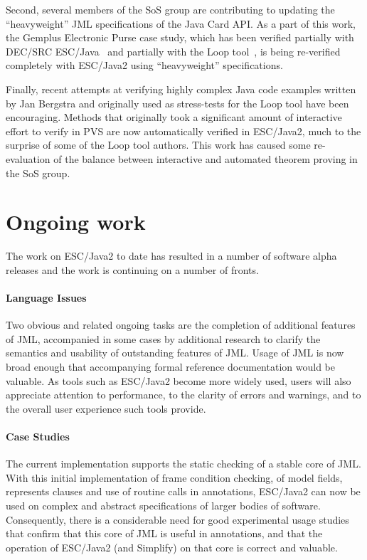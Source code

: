 \documentclass{sig-alternate}
\begin{document}
Second, several members of the SoS group are contributing to updating
the ``heavyweight'' JML specifications of the Java Card API.  As a
part of this work, the Gemplus Electronic Purse case study, which has
been verified partially with DEC/SRC ESC/Java~\cite{CatanoHuisman02}
and partially with the Loop tool~\cite{BreunesseJacobsBerg02}, is being
re-verified completely with ESC/Java2 using ``heavyweight''
specifications.

Finally, recent attempts at verifying highly complex Java code
examples written by Jan Bergstra and originally used as stress-tests
for the Loop tool have been encouraging.  Methods that originally took
a significant amount of interactive effort to verify in PVS are now
automatically verified in ESC/Java2, much to the surprise of some of
the Loop tool authors.  This work has caused some re-evaluation of the
balance between interactive and automated theorem proving in the SoS
group.



\section{Ongoing work}
The work on ESC/Java2 to date has resulted in a number of software
alpha releases and the work is continuing on a number of fronts.

\paragraph*{Language Issues} Two obvious and related ongoing tasks are
the completion of additional features of JML, accompanied in some
cases by additional research to clarify the semantics and usability of
outstanding features of JML.  Usage of JML is now broad enough that
accompanying formal reference documentation would be valuable.  As
tools such as ESC/Java2 become more widely used, users will also
appreciate attention to performance, to the clarity of errors and
warnings, and to the overall user experience such tools provide.

\paragraph*{Case Studies} The current implementation supports the
static checking of a stable core of JML.  With this initial
implementation of frame condition checking, of model fields,
represents clauses and use of routine calls in annotations, ESC/Java2
can now be used on complex and abstract specifications of larger
bodies of software.  Consequently, there is a considerable need for
good experimental usage studies that confirm that this core of JML is
useful in annotations, and that the operation of ESC/Java2 (and
Simplify) on that core is correct and valuable.
\end{document}
